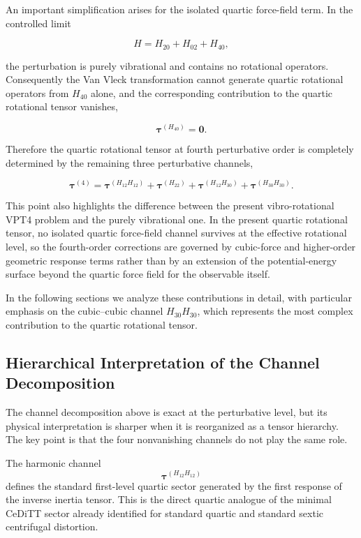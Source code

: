 \documentclass[aip,jcp,reprint]{revtex4-2}
\begin{document}
An important simplification arises for the isolated quartic force-field
term. In the controlled limit

\begin{equation}
H = H_{20} + H_{02} + H_{40},
\end{equation}

the perturbation is purely vibrational and contains no rotational
operators. Consequently the Van Vleck transformation cannot generate
quartic rotational operators from $H_{40}$ alone, and the corresponding
contribution to the quartic rotational tensor vanishes,

\begin{equation}
\bm{\tau}^{(H_{40})} = \bm{0}.
\end{equation}

Therefore the quartic rotational tensor at fourth perturbative order is
completely determined by the remaining three perturbative channels,

\begin{equation}
\bm{\tau}^{(4)} =
\bm{\tau}^{(H_{12}H_{12})}
+
\bm{\tau}^{(H_{22})}
+
\bm{\tau}^{(H_{12}H_{30})}
+
\bm{\tau}^{(H_{30}H_{30})}.
\end{equation}

This point also highlights the difference between the present
vibro-rotational VPT4 problem and the purely vibrational one. In the
present quartic rotational tensor, no isolated quartic force-field channel
survives at the effective rotational level, so the fourth-order
corrections are governed by cubic-force and higher-order geometric
response terms rather than by an extension of the potential-energy
surface beyond the quartic force field for the observable itself.

In the following sections we analyze these contributions in detail,
with particular emphasis on the cubic--cubic channel $H_{30}H_{30}$,
which represents the most complex contribution to the quartic
rotational tensor.

\subsection{Hierarchical Interpretation of the Channel Decomposition}

The channel decomposition above is exact at the perturbative level, but
its physical interpretation is sharper when it is reorganized as a tensor
hierarchy.  The key point is that the four nonvanishing channels do not play
the same role.

The harmonic channel
\begin{equation}
\bm{\tau}^{(H_{12}H_{12})}
\end{equation}
defines the standard first-level quartic sector generated by the first
response of the inverse inertia tensor.  This is the direct quartic analogue
of the minimal CeDiTT sector already identified for standard quartic and
standard sextic centrifugal distortion.
\end{document}
